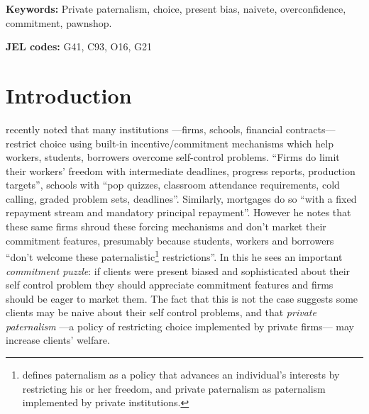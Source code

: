 \documentclass[11pt]{article}
\begin{document}
\textbf{Keywords: } Private paternalism, choice, present bias, naivete, overconfidence, commitment, pawnshop.

\textbf{JEL codes:} G41, C93, O16, G21

\newpage





\section{Introduction}

\cite{Laibson2018} recently noted that many institutions ---firms, schools, financial contracts--- restrict choice using built-in incentive/commitment mechanisms which help workers, students, borrowers overcome self-control problems. ``Firms do limit their workers' freedom with intermediate deadlines, progress reports, production targets'', schools with ``pop quizzes, classroom attendance requirements, cold calling, graded problem sets, deadlines''. Similarly, mortgages do so ``with a fixed repayment stream and mandatory principal repayment''. However he notes that these same firms shroud these forcing mechanisms and don't market their commitment features, presumably because students, workers and borrowers ``don't welcome these paternalistic\footnote{\cite{Laibson2018} defines paternalism as a policy that advances an individual's interests by restricting his or her freedom, and private paternalism as paternalism implemented by private institutions.} restrictions''. In this he sees an important \textit{commitment puzzle}: if clients were present biased and  sophisticated about their self control problem they should appreciate commitment features and firms should be eager to market them. The fact that this is not the case suggests some clients may be naive about their self control problems, and that \textit{private paternalism}  ---a policy of restricting choice implemented by private firms--- may increase clients' welfare. 
\end{document}
